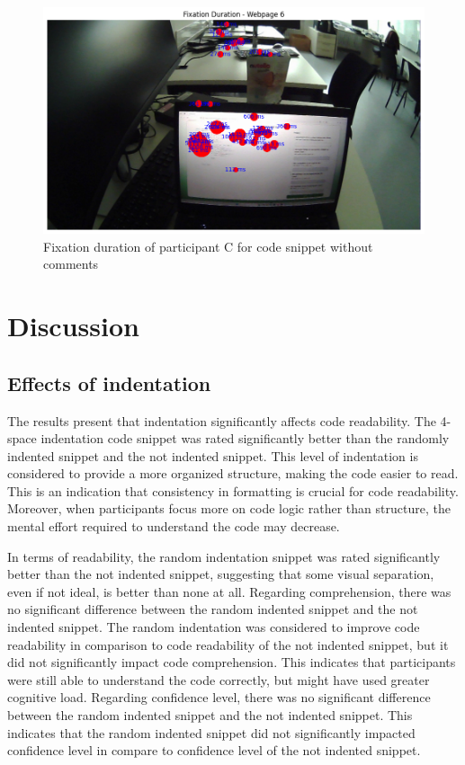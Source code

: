 \begin{figure} [H]
  \centering
  \includegraphics[scale=0.6]{figures/0-com.png}
  \caption{Fixation duration of  participant C for code snippet without comments}
  \label{fig:AnhangsChor}
\end{figure}





\chapter{Discussion}



\section{Effects of indentation} 
The results present that indentation significantly affects code readability. The 4-space indentation code snippet was rated significantly better than the randomly indented snippet and the not indented snippet. This level of indentation is considered to provide a more organized structure, making the code easier to read. This is an indication that consistency in formatting is crucial for code readability. Moreover, when participants focus more on code logic rather than structure, the mental effort required to understand the code may decrease.


In terms of readability, the random indentation snippet was rated significantly better than the not indented snippet, suggesting that some visual separation, even if not ideal, is better than none at all.  Regarding comprehension, there was no significant difference between the random indented snippet and the not indented snippet. The random indentation was considered to improve code readability in comparison to code readability of the not indented snippet, but it did not significantly impact code comprehension.  This indicates that participants were still able to understand the code correctly, but might have used greater cognitive load. Regarding confidence level, there was no significant difference between the random indented snippet and the not indented snippet. This indicates that the random indented snippet did not significantly impacted confidence level in compare to confidence level of the not indented snippet. 

